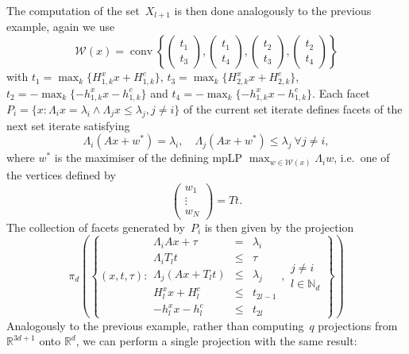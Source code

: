 \documentclass[smallextended]{svjour3}       %
\numberwithin{equation}{section}
\DeclareMathOperator*{\conv}{conv}
\begin{document}
The computation of the set~$X_{l+1}$ is then done analogously to the previous example, again we use 
%
$$
  \mathcal W(x) = \conv\left\{\begin{pmatrix}t_1\\ t_3\end{pmatrix},\begin{pmatrix}t_1\\ t_4\end{pmatrix},
  \begin{pmatrix} t_2\\ t_3\end{pmatrix},\begin{pmatrix}t_2\\ t_4\end{pmatrix}
  \right\}
$$
%
with $t_1=\max_k\{H_{1,k}^x x+H_{1,k}^c\}$, $t_3=\max_k\{H_{2,k}^x x+H_{2,k}^c\}$, $t_2={-\max_k}\{-h_{1,k}^x x-h_{1,k}^c\}$ and $t_4={-\max_k}\{-h_{1,k}^x x-h_{1,k}^c\}$.
%
Each facet~$P_i=\{x:\Lambda_i x=\lambda_i\wedge\Lambda_jx\leq\lambda_j,j\neq i\}$ of the current set iterate defines facets of the next set iterate satisfying
%
\begin{equation}
\Lambda_i(Ax+w^\ast)=\lambda_i, \quad \Lambda_j(Ax+w^\ast)\leq\lambda_j \ \forall j\neq i ,
\end{equation}
%
where $w^\ast$ is the maximiser of the defining mpLP $\max_{w\in\mathcal W(x)}\Lambda_iw$, i.e.~one of the vertices defined by
%
$$
  \begin{pmatrix} w_1\\ \vdots \\ w_N\end{pmatrix}= Tt.
$$
%
The collection of facets generated by~$P_i$ is then given by the projection
%
\begin{equation}
  \pi_d\left(\left\{(x,t,\tau):\begin{array}{rcl}
  \Lambda_iAx+\tau&=&\lambda_i\\
  \Lambda_i T_lt&\leq&\tau\\
  \Lambda_j(Ax+T_lt)&\leq&\lambda_j\\
  H_l^x x + H_l^c&\leq&t_{2l-1}\\
  -h_l^x x - h_l^c&\leq&t_{2l}
  \end{array}, \begin{array}{l}
  j\neq i\\
  l\in\mathbb N_d\end{array}
  \right\}\right)
\end{equation}
%
Analogously to the previous example, rather than computing~$q$ projections from $\mathbb R^{3d+1}$ onto $\mathbb R^d$, we can perform a single projection with the same result:
\end{document}
